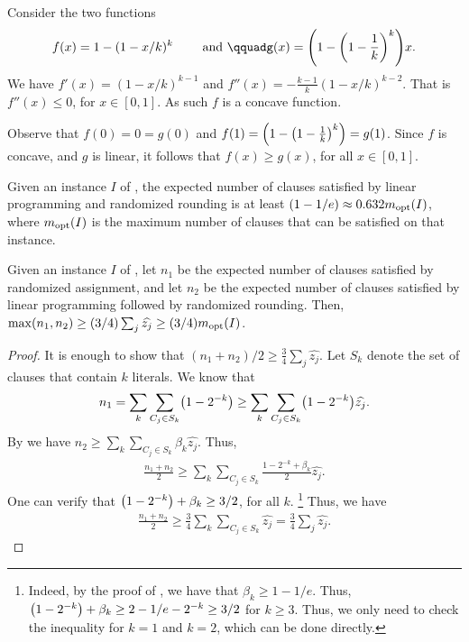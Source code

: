     \begin{tedium}
        Consider the two functions
        \begin{equation*}
            f(x) = 1 - (1-x/k)^k
            \qquad \text{ and }\qquad%
            g(x) = \pth{1- \pth{1-\frac{1}{k}}^k} x.
        \end{equation*}
        We have $f'(x) = (1-x/k)^{k-1}$ and
        $f''(x) = -\frac{k-1}{k}(1-x/k)^{k-2}$. That is
        $f''(x) \leq 0$, for $x \in [0,1]$. As such $f$ is a concave
        function.

        Observe that $f(0) =0 =g(0)$ and
        $f(1) = \pth{1- \pth{1-\frac{1}{k}}^k} = g(1)$. Since $f$ is
        concave, and $g$ is linear, it follows that $f(x) \geq g(x)$,
        for all $x \in [0,1]$.
    \end{tedium}

\begin{theorem}
    Given an instance $I$ of , the expected number
    of clauses satisfied by linear programming and randomized rounding
    is at least $(1-1/e)\approx 0.632m_{\mathrm{opt}}(I)$, where $m_{\mathrm{opt}}(I)$ is
    the maximum number of clauses that can be satisfied on that
    instance.
\end{theorem}

\begin{theorem}
    Given an instance $I$ of , let $n_1$ be the
    expected number of clauses satisfied by randomized assignment, and
    let $n_2$ be the expected number of clauses satisfied by linear
    programming followed by randomized rounding. Then, $\max(n_1, n_2)
    \geq (3/4) \sum_j \widehat{z_j} \geq (3/4)m_{\mathrm{opt}}(I)$.
\end{theorem}

\begin{proof}
    It is enough to show that $(n_1 + n_2)/2 \geq
    \frac{3}{4} \sum_j \widehat{z_j}$. Let $S_k$ denote the
    set of clauses that contain $k$ literals. We know that
    \begin{align*}
    n_1 = \sum_k \sum_{C_j \in S_k} \pth{1-2^{-k}} \geq \sum_k
    \sum_{C_j \in S_k} \pth{1 - 2^{-k}} \widehat{z_j}.
    \end{align*}
    By  we have $n_2 \geq \sum_k \sum_{C_j \in
       S_k} \beta_k \widehat{z_j}$.  Thus,
    \begin{align*}
    \frac{n_1 + n_2}{2} \geq \sum_k \sum_{C_j \in S_k}
    \frac{1 - 2^{-k} + \beta_k}{2} \widehat{z_j}.
    \end{align*}
    One can verify that $\pth{1-2^{-k}} + \beta_k \geq 3/2$, for all
    $k$. \footnote{Indeed, by the proof of , we have that
       $\beta_k \geq 1-1/e$. Thus, $\pth[]{1-2^{-k}} + \beta_k \geq
       2-1/e - 2^{-k} \geq 3/2$ for $k\geq 3$. Thus, we only need to
       check the inequality for $k=1$ and $k=2$, which can be done
       directly.}  Thus, we have
    \begin{align*}
        \frac{n_1 + n_2}{2} \geq \frac{3}{4} \sum_k \sum_{C_j \in S_k}
        \widehat{z_j} = \frac{3}{4} \sum_j \widehat{z_j}.
    \end{align*}
\end{proof}

